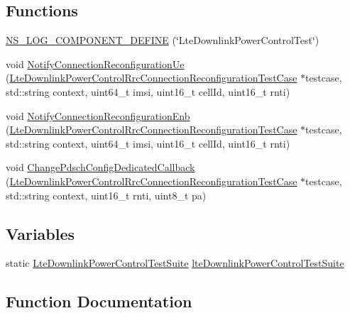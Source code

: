 \subsection*{Functions}
\begin{DoxyCompactItemize}
\item 
\hyperlink{lte-test-downlink-power-control_8cc_a2f24ef9a95ca5590b0b6250e5bd8b15a}{N\+S\+\_\+\+L\+O\+G\+\_\+\+C\+O\+M\+P\+O\+N\+E\+N\+T\+\_\+\+D\+E\+F\+I\+NE} (\char`\"{}Lte\+Downlink\+Power\+Control\+Test\char`\"{})
\item 
void \hyperlink{lte-test-downlink-power-control_8cc_a1dd1318fb19198c99f7f822e7be384ab}{Notify\+Connection\+Reconfiguration\+Ue} (\hyperlink{classLteDownlinkPowerControlRrcConnectionReconfigurationTestCase}{Lte\+Downlink\+Power\+Control\+Rrc\+Connection\+Reconfiguration\+Test\+Case} $\ast$testcase, std\+::string context, uint64\+\_\+t imsi, uint16\+\_\+t cell\+Id, uint16\+\_\+t rnti)
\item 
void \hyperlink{lte-test-downlink-power-control_8cc_aa2299ae5ebf8dfb41cdfb7a62ac7b7bd}{Notify\+Connection\+Reconfiguration\+Enb} (\hyperlink{classLteDownlinkPowerControlRrcConnectionReconfigurationTestCase}{Lte\+Downlink\+Power\+Control\+Rrc\+Connection\+Reconfiguration\+Test\+Case} $\ast$testcase, std\+::string context, uint64\+\_\+t imsi, uint16\+\_\+t cell\+Id, uint16\+\_\+t rnti)
\item 
void \hyperlink{lte-test-downlink-power-control_8cc_ab8053a215895f29bb4d67d4ff7e54bd1}{Change\+Pdsch\+Config\+Dedicated\+Callback} (\hyperlink{classLteDownlinkPowerControlRrcConnectionReconfigurationTestCase}{Lte\+Downlink\+Power\+Control\+Rrc\+Connection\+Reconfiguration\+Test\+Case} $\ast$testcase, std\+::string context, uint16\+\_\+t rnti, uint8\+\_\+t pa)
\end{DoxyCompactItemize}
\subsection*{Variables}
\begin{DoxyCompactItemize}
\item 
static \hyperlink{classLteDownlinkPowerControlTestSuite}{Lte\+Downlink\+Power\+Control\+Test\+Suite} \hyperlink{lte-test-downlink-power-control_8cc_a4fe2ef2bc86a8a492a5e678573a895b0}{lte\+Downlink\+Power\+Control\+Test\+Suite}
\end{DoxyCompactItemize}


\subsection{Function Documentation}
